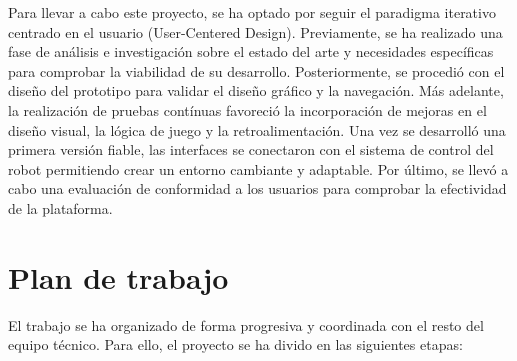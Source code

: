 Para llevar a cabo este proyecto, se ha optado por seguir el paradigma iterativo centrado en el usuario (User-Centered Design).
Previamente, se ha realizado una fase de análisis e investigación sobre el estado del arte y necesidades específicas para comprobar la viabilidad de su desarrollo.
Posteriormente, se procedió con el diseño del prototipo para validar el diseño gráfico y la navegación.
Más adelante, la realización de pruebas contínuas favoreció la incorporación de mejoras en el diseño visual, la lógica de juego y la retroalimentación.
Una vez se desarrolló una primera versión fiable, las interfaces se conectaron con el sistema de control del robot permitiendo crear un entorno cambiante y adaptable.
Por último, se llevó a cabo una evaluación de conformidad a los usuarios para comprobar la efectividad de la plataforma.

\section{Plan de trabajo}
\label{sec:plantrabajo}

El trabajo se ha organizado de forma progresiva y coordinada con el resto del equipo técnico.
Para ello, el proyecto se ha divido en las siguientes etapas:


